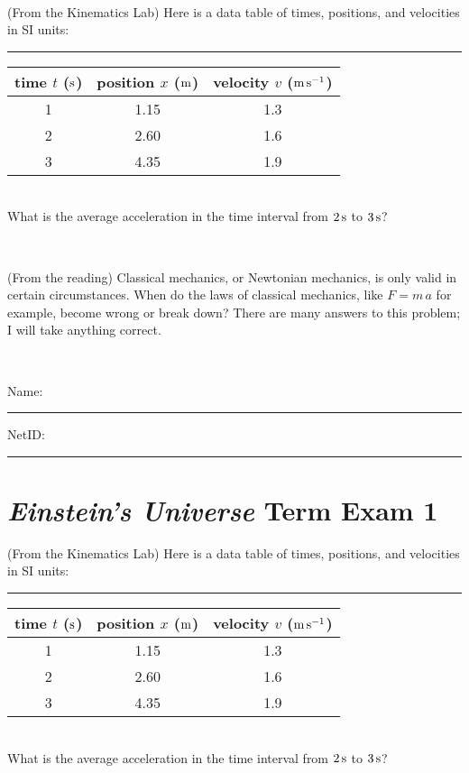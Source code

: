 \documentclass[12pt, letterpaper]{article}
\begin{document}
\vfill ~

\begin{problem} (From the Kinematics Lab)
Here is a data table of times, positions, and velocities in SI units:\\
\rule{1.0in}{0pt}\begin{tabular}{c|c|c}
time $t$ ($\mathrm{s}$) & position $x$ ($\mathrm{m}$) & velocity $v$ ($\mathrm{m}\,\mathrm{s}^{-1}$) \\
\hline
1 & 1.15 & 1.3 \\
2 & 2.60 & 1.6 \\
3 & 4.35 & 1.9 \\
\hline
\end{tabular}\\
What is the average acceleration in the time interval from $2\,\mathrm{s}$ to $3\,\mathrm{s}$?
\end{problem}


\vfill ~

\begin{problem} (From the reading)
Classical mechanics, or Newtonian mechanics, is only valid in certain
circumstances. When do the laws of classical mechanics, like $F =
m\,a$ for example, become wrong or break down? There are many answers
to this problem; I will take anything correct.
\end{problem}


\vfill ~


\cleardoublepage



\noindent
Name: \rule[-1ex]{0.60\textwidth}{0.1pt}
NetID: \rule[-1ex]{0.20\textwidth}{0.1pt}

\section*{\textsl{Einstein's Universe} Term Exam 1}
\setcounter{problem}{1}


\begin{problem} (From the Kinematics Lab)
Here is a data table of times, positions, and velocities in SI units:\\
\rule{1.0in}{0pt}\begin{tabular}{c|c|c}
time $t$ ($\mathrm{s}$) & position $x$ ($\mathrm{m}$) & velocity $v$ ($\mathrm{m}\,\mathrm{s}^{-1}$) \\
\hline
1 & 1.15 & 1.3 \\
2 & 2.60 & 1.6 \\
3 & 4.35 & 1.9 \\
\hline
\end{tabular}\\
What is the average acceleration in the time interval from $2\,\mathrm{s}$ to $3\,\mathrm{s}$?
\end{problem}
\end{document}
